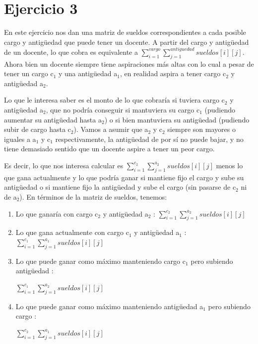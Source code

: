 \section{Ejercicio 3}

En este ejercicio nos dan una matriz de sueldos correspondientes a cada posible cargo y antigüedad que puede tener un docente. A partir del cargo y antigüedad de un docente, lo que cobra es equivalente a $\sum_{i = 1}^{cargo} \sum_{j = 1}^{antiguedad} sueldos[i][j]$. Ahora bien un docente siempre tiene aspiraciones más altas con lo cual a pesar de tener un cargo c$_1$ y una antigüedad a$_1$, en realidad aspira a tener cargo c$_2$ y antigüedad a$_2$. \newline

Lo que le interesa saber es el monto de lo que cobraría si tuviera cargo c$_2$ y antigüedad a$_2$, que no podría conseguir si mantuviera su cargo c$_1$ (pudiendo aumentar su antigüedad hasta a$_2$) o si bien mantuviera su antigüedad (pudiendo subir de cargo hasta c$_2$). Vamos a asumir que a$_2$ y c$_2$ siempre son mayores o iguales a a$_1$ y c$_1$ respectivamente, la antigüedad de por sí no puede bajar, y no tiene demasiado sentido que un docente aspire a tener un peor cargo. \newline

Es decir, lo que nos interesa calcular es $\sum_{i = 1}^{c_2} \sum_{j = 1}^{a_2} sueldos[i][j]$ menos lo que gana actualmente y lo que podría ganar si mantiene fijo el cargo y sube su antigüedad o si mantiene fijo la antigüedad y sube el cargo (sin pasarse de c$_2$ ni de a$_2$). En términos de la matriz de sueldos, tenemos: 

\begin{enumerate}
	\item Lo que ganaría con cargo c$_2$ y antigüedad a$_2$ : $\sum_{i = 1}^{c_2} \sum_{j = 1}^{a_2} sueldos[i][j]$
	\item Lo que gana actualmente con cargo c$_1$ y antigüedad a$_1$ : $\sum_{i = 1}^{c_1} \sum_{j = 1}^{a_1} sueldos[i][j]$
	\item Lo que puede ganar como máximo manteniendo cargo c$_1$ pero subiendo antigüedad :

	 $\sum_{i = 1}^{c_1} \sum_{j = 1}^{a_2} sueldos[i][j]$
	\item Lo que puede ganar como máximo manteniendo antigüedad a$_1$ pero subiendo cargo : 

	$\sum_{i = 1}^{c_2} \sum_{j = 1}^{a_1} sueldos[i][j]$
\end{enumerate}

